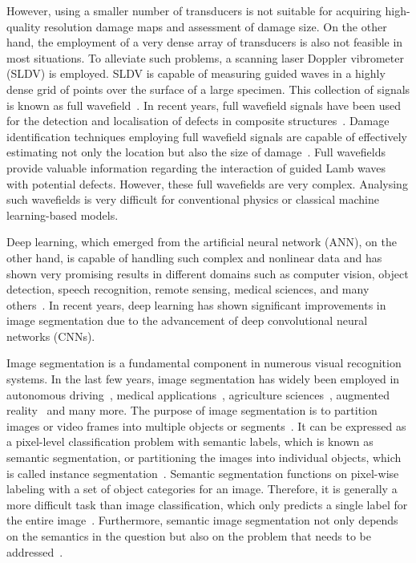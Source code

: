 \begin{sloppypar}
	However, using a smaller number of transducers is not suitable for acquiring high-quality resolution damage maps and assessment of damage size.
	On the other hand, the employment of a very dense array of transducers is also not feasible in most situations. 
	To alleviate such problems, a scanning laser Doppler vibrometer (SLDV) is employed.
	SLDV is capable of measuring guided waves in a highly dense grid of points over the surface of a large specimen.
	This collection of signals is known as full wavefield~\cite{Radzienski2019a}. 
	In recent years, full wavefield signals have been used for the detection and localisation of defects in composite
	structures~\cite{Radzienski2019a, Girolamo2018a, kudela2018impact,  rogge2013characterization}.
	Damage identification techniques employing full wavefield signals are capable of effectively estimating not only the location but also the size of damage~\cite{Girolamo2018a, kudela2018impact}.
	Full wavefields provide valuable information regarding the interaction of guided Lamb waves with potential defects.
	However, these full wavefields are very complex.
	Analysing such wavefields is very difficult for conventional physics or classical machine learning-based models.
	
	Deep learning, which emerged from the artificial neural network (ANN), on the other hand, is capable of handling such complex and nonlinear data and has shown very promising results in different domains such as computer vision, object detection, speech recognition, remote sensing, medical sciences, and many others~\cite{mohanty2016using, zhang2020well, pashaei2020review}.
	In recent years, deep learning has shown significant improvements in image segmentation due to the advancement of deep convolutional neural networks (CNNs).
	
	Image segmentation is a fundamental component in numerous visual recognition
	systems. In the last few years, image segmentation has widely been
	employed in autonomous driving~\cite{ros2016synthia, li2018real}, medical applications~\cite{taghanaki2021deep}, agriculture sciences~\cite{milioto2018real}, augmented reality~\cite{miksik2015semantic} and many more. 
	The purpose of image segmentation is to partition images or video frames into multiple objects or segments~\cite{szeliski2010computer}.
	It can be expressed as a pixel-level classification problem with semantic labels, which is known as semantic segmentation, or partitioning the images into individual objects, which is called instance segmentation~\cite{szeliski2010computer, minaee2021image}. 
	Semantic segmentation functions on pixel-wise labeling with a set of object categories for an image. 
	Therefore, it is generally a more difficult task than image classification, which only predicts a single label for the entire image~\cite{minaee2021image}.
	Furthermore, semantic image segmentation not only depends on the semantics in the question but also on the problem that needs to be addressed~\cite{ghosh2019understanding}.
	

\end{sloppypar}
